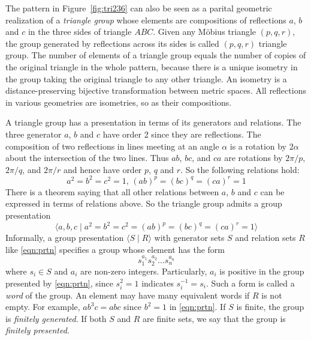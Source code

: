 \documentclass[12pt]{article}
\begin{document}
The pattern in Figure~\ref{fig:tri236} can also be seen as a parital
geometric realization of a \emph{triangle group} whose elements are
compositions of reflections $a$, $b$ and $c$ in the three sides of
triangle $ABC$. Given any M\"obius triangle $(p, q, r)$, the group
generated by reflections across its sides is called $(p, q, r)$
triangle group. The number of elements of a triangle group equals the
number of copies of the original triangle in the whole pattern,
because there is a unique isometry in the group taking the original
triangle to any other triangle. An isometry is a distance-preserving
bijective transformation between metric spaces. All reflections in
various geometries are isometries, so as their compositions.

A triangle group has a presentation in terms of its generators and
relations. The three generator $a$, $b$ and $c$ have order 2 since
they are reflections. The composition of two reflections in lines
meeting at an angle $\alpha$ is a rotation by $2\alpha$ about the
intersection of the two lines. Thus $ab$, $bc$, and $ca$ are rotations
by $2\pi/p$, $2\pi/q$, and $2\pi/r$ and hence have order $p$, $q$ and
$r$. So the following relations hold:
\begin{equation*}
  a^2 = b^2 = c^2 = 1,\, (ab)^p = (bc)^q = (ca)^r = 1
\end{equation*}
There is a theorem saying that all other relations between $a$, $b$
and $c$ can be expressed in terms of relations above. So the triangle
group admits a group presentation
\begin{equation}\label{eqn:prtn}
  \langle a, b, c \mid a^2 = b^2 = c^2 = (ab)^p = (bc)^q = (ca)^r = 1\rangle
\end{equation}
Informally, a group presentation $\langle S \mid R \rangle$ with
generator sets $S$ and relation sets $R$ like \eqref{eqn:prtn}
specifies a group whose element has the form
\begin{equation*}
  s_1^{a_1}s_2^{a_2}\dots s_n^{a_n}
\end{equation*}
where $s_i\in S$ and $a_i$ are non-zero integers. Particularly, $a_i$
is positive in the group presented by \eqref{eqn:prtn}, since
$s_i^2=1$ indicates $s_i^{-1}=s_i$. Such a form is called a
\emph{word} of the group. An element may have many equivalent words if
$R$ is not empty. For example, $ab^3c=abc$ since $b^2=1$ in
\eqref{eqn:prtn}. If $S$ is finite, the group is \emph{finitely
generated}. If both $S$ and $R$ are finite sets, we say that the group
is \emph{finitely presented}.
\end{document}
